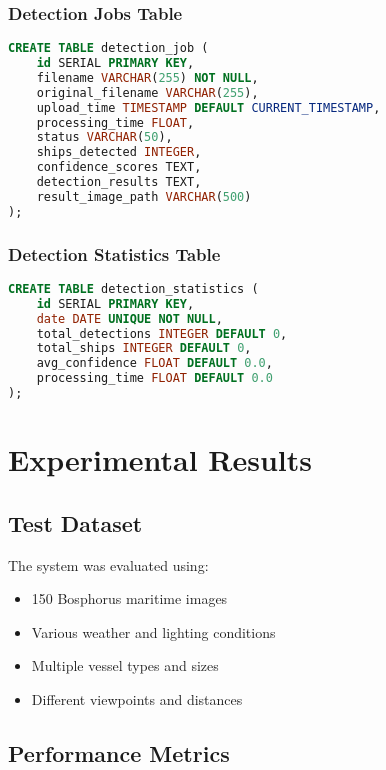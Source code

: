 \documentclass[12pt,a4paper]{report}
\begin{document}
\subsection{Detection Jobs Table}
\begin{lstlisting}[language=SQL, caption=Detection Jobs Schema]
CREATE TABLE detection_job (
    id SERIAL PRIMARY KEY,
    filename VARCHAR(255) NOT NULL,
    original_filename VARCHAR(255),
    upload_time TIMESTAMP DEFAULT CURRENT_TIMESTAMP,
    processing_time FLOAT,
    status VARCHAR(50),
    ships_detected INTEGER,
    confidence_scores TEXT,
    detection_results TEXT,
    result_image_path VARCHAR(500)
);
\end{lstlisting}

\subsection{Detection Statistics Table}
\begin{lstlisting}[language=SQL, caption=Statistics Schema]
CREATE TABLE detection_statistics (
    id SERIAL PRIMARY KEY,
    date DATE UNIQUE NOT NULL,
    total_detections INTEGER DEFAULT 0,
    total_ships INTEGER DEFAULT 0,
    avg_confidence FLOAT DEFAULT 0.0,
    processing_time FLOAT DEFAULT 0.0
);
\end{lstlisting}

\chapter{Experimental Results}

\section{Test Dataset}
The system was evaluated using:
\begin{itemize}
    \item 150 Bosphorus maritime images
    \item Various weather and lighting conditions
    \item Multiple vessel types and sizes
    \item Different viewpoints and distances
\end{itemize}

\section{Performance Metrics}
\end{document}
